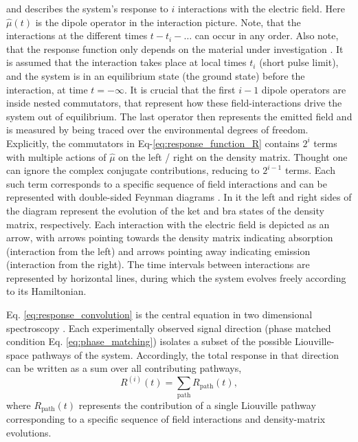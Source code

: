 \noindent
and describes the system's response to $i$ interactions with the electric field.
Here $\hat{\mu}(t)$ is the dipole operator in the interaction picture.
Note, that the interactions at the different times $t - t_{i} - \ldots$ can occur in any order.
Also note, that the response function only depends on the material under investigation \cite{hamm2005principlesnonlinearoptical}.
It is assumed that the interaction takes place at local times $t_i$ (short pulse limit), and the system is in an equilibrium state (the ground state) before the interaction, at time $t = - \infty$.
It is crucial that the first $i-1$ dipole operators are inside nested commutators, that represent how these field-interactions drive the system out of equilibrium. The last operator then represents the emitted field and is measured by being traced over the environmental degrees of freedom.
Explicitly, the commutators in Eq-\eqref{eq:response_function_R} contains $2^i$ terms with multiple actions of $\hat{\mu}$ on the left / right on the density matrix.
Thought one can ignore the complex conjugate contributions, reducing to $2^{i-1}$ terms.
Each such term corresponds to a specific sequence of field interactions and can be represented with double-sided Feynman diagrams \cite{mukamel1995principlesnonlinearoptical}. In it the left and right sides of the diagram represent the evolution of the ket and bra states of the density matrix, respectively. Each interaction with the electric field is depicted as an arrow, with arrows pointing towards the density matrix indicating absorption (interaction from the left) and arrows pointing away indicating emission (interaction from the right). The time intervals between interactions are represented by horizontal lines, during which the system evolves freely according to its Hamiltonian.


\noindent
Eq. \eqref{eq:response_convolution} is the central equation in two dimensional spectroscopy \cite{segarra-martietal2018accuratesimulationtwodimensional}. Each experimentally observed signal direction (phase matched condition Eq. \eqref{eq:phase_matching}) isolates a subset of the possible Liouville-space pathways of the system.
Accordingly, the total response in that direction can be written as a sum over all contributing pathways,
\begin{equation}
	R^{(i)}(t) = \sum_{\text{path}} R_{\text{path}}(t),
	\label{eq:Liouville_pathways}
\end{equation}
where $R_{\text{path}}(t)$ represents the contribution of a single Liouville pathway corresponding to a specific sequence of field interactions and density-matrix evolutions.


